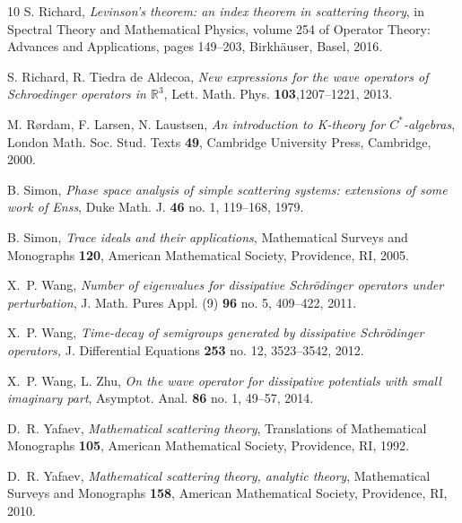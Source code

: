 \documentclass{article}
\def\R{\mathbb R}
\begin{document}
\begin{thebibliography}{10}
S. Richard,
\emph{Levinson's theorem: an index theorem in scattering theory},
in Spectral Theory and Mathematical Physics, volume 254 of Operator Theory: Advances and Applications, pages 149--203, Birkh\"auser, Basel, 2016.

S. Richard, R. Tiedra de Aldecoa, 
\emph{New expressions for the wave operators of Schroedinger operators in $\R^3$},
Lett. Math. Phys. {\bf 103},1207--1221, 2013. 

M. R\o rdam, F. Larsen, N. Laustsen, 
\emph{An introduction to K-theory for $C^*$-algebras}, 
London Math. Soc. Stud. Texts {\bf 49},
Cambridge University Press, Cambridge, 2000.

B. Simon,
\emph{Phase space analysis of simple scattering systems: extensions of some
 work of {E}nss},
Duke Math. J. {\bf 46} no. 1, 119--168, 1979.

B. Simon,
\emph{Trace ideals and their applications},
Mathematical Surveys and Monographs {\bf 120}, 
American Mathematical Society, Providence, RI, 2005.

X.~P. Wang,
\emph{Number of eigenvalues for dissipative {S}chr\"odinger operators under
perturbation},
J. Math. Pures Appl. (9)  {\bf 96}  no. 5, 409--422, 2011.

X.~P. Wang,
\emph{Time-decay of semigroups generated by dissipative {S}chr\"odinger
operators,}
J. Differential Equations {\bf 253} no. 12, 3523--3542, 2012.

X.~P. Wang, L. Zhu,
\emph{On the wave operator for dissipative potentials with small imaginary part}, 
Asymptot. Anal. {\bf 86} no. 1, 49--57, 2014.

D.~R. Yafaev,
\emph{Mathematical scattering theory}, 
Translations of Mathematical Monographs {\bf 105}, 
American Mathematical Society, Providence, RI, 1992.

D.~R. Yafaev,
\emph{Mathematical scattering theory, analytic theory}, 
Mathematical Surveys and Monographs {\bf 158}, 
American Mathematical Society, Providence, RI, 2010.

\end{thebibliography}

\end{document}
